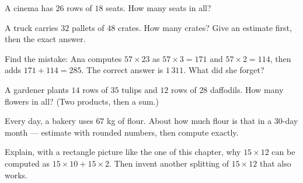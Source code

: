 \begin{exercise}[$\star$]\label{exo:g4:mult:6}
A cinema has $26$ rows of $18$ seats. How many seats in all?
\end{exercise}

\begin{exercise}[$\star$]\label{exo:g4:mult:7}
A truck carries $32$ pallets of $48$ crates. How many crates? Give
an estimate first, then the exact answer.
\end{exercise}

\begin{exercise}[$\star$]\label{exo:g4:mult:8}
Find the mistake: Ana computes $57 \times 23$ as
$57 \times 3 = 171$ and $57 \times 2 = 114$, then adds
$171 + 114 = 285$. The correct answer is $1\,311$. What did she
forget?
\end{exercise}

\begin{exercise}[$\star\star$]\label{exo:g4:mult:9}
A gardener plants $14$ rows of $35$ tulips and $12$ rows of $28$
daffodils. How many flowers in all? (Two products, then a sum.)
\end{exercise}

\begin{exercise}[$\star\star$]\label{exo:g4:mult:10}
Every day, a bakery uses $67$ kg of flour. About how much flour is
that in a $30$-day month --- estimate with rounded numbers, then
compute exactly.
\end{exercise}

\begin{exercise}[$\star\star$]\label{exo:g4:mult:11}
Explain, with a rectangle picture like the one of this chapter, why
$15 \times 12$ can be computed as $15 \times 10 + 15 \times 2$.
Then invent another splitting of $15 \times 12$ that also works.
\end{exercise}
